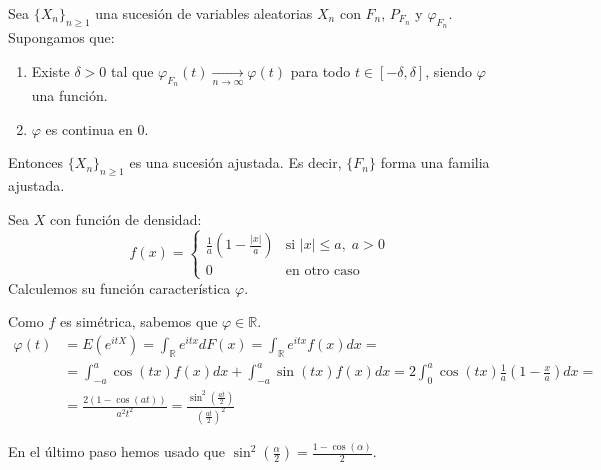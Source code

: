 \begin{corollary}
    Sea $\{X_n\}_{n \geq 1}$ una sucesión de variables aleatorias $X_n$ con $F_n$, $P_{F_n}$ y $\varphi_{F_n}$.
    Supongamos que:
    \begin{enumerate}
        \item Existe $\delta > 0$ tal que $\varphi_{F_n}(t) \xrightarrow[n \to \infty]{} \varphi(t)$ para todo $t \in [-\delta, \delta]$, siendo $\varphi$ una función.
        \item $\varphi$ es continua en 0.
    \end{enumerate}
    Entonces $\{X_n\}_{n \geq 1}$ es una sucesión ajustada.
    Es decir, $\{F_n\}$ forma una familia ajustada.
\end{corollary}

\begin{exercise}
    Sea $X$ con función de densidad:
    $$f(x) = \begin{cases}
            \frac{1}{a} \left(1 - \frac{|x|}{a}\right) & \text{si } |x| \leq a, \; a > 0 \\
            0                                          & \text{en otro caso}
        \end{cases}$$
    Calculemos su función característica $\varphi$.

    Como $f$ es simétrica, sabemos que $\varphi \in \mathbb{R}$.
    \begin{align*}
        \varphi(t) & = E(e^{itX}) = \int_\mathbb{R} e^{itx}dF(x) = \int_\mathbb{R} e^{itx}f(x)dx =                                           \\
                   & = \int_{-a}^a \cos(tx)f(x)dx + \int_{-a}^a \sin(tx)f(x)dx = 2\int_0^a \cos(tx)\frac{1}{a}\left(1-\frac{x}{a}\right)dx = \\
                   & = \frac{2(1-\cos(at))}{a^2t^2} = \frac{\sin^2\left(\frac{at}{2}\right)}{\left(\frac{at}{2}\right)^2}
    \end{align*}

    En el último paso hemos usado que $\sin^2(\frac{\alpha}{2}) = \frac{1-\cos(\alpha)}{2}$.
\end{exercise}

